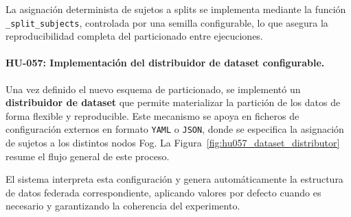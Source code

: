 \documentclass{report}
\begin{document}
La asignación determinista de sujetos a splits se implementa mediante la función \texttt{\_split\_subjects}, controlada por una semilla configurable, lo que asegura la reproducibilidad completa del particionado entre ejecuciones.


\vspace{0.15em}
\paragraph{HU-057: Implementación del distribuidor de dataset configurable.}

Una vez definido el nuevo esquema de particionado, se implementó un \textbf{distribuidor de dataset} que permite materializar la partición de los datos de forma flexible y reproducible. Este mecanismo se apoya en ficheros de configuración externos en formato \texttt{YAML} o \texttt{JSON}, donde se especifica la asignación de sujetos a los distintos nodos Fog. La Figura~\ref{fig:hu057_dataset_distributor} resume el flujo general de este proceso.

El sistema interpreta esta configuración y genera automáticamente la estructura de datos federada correspondiente, aplicando valores por defecto cuando es necesario y garantizando la coherencia del experimento.
\end{document}
